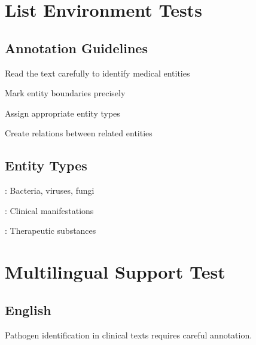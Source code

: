\documentclass[11pt,a4paper]{article}
\begin{document}




\section{List Environment Tests}

\subsection{Annotation Guidelines}
\begin{steplist}
    \item Read the text carefully to identify medical entities
    \item Mark entity boundaries precisely
    \item Assign appropriate entity types
    \item Create relations between related entities
\end{steplist}

\subsection{Entity Types}
\begin{entitylist}
    \item {}: Bacteria, viruses, fungi
    \item {}: Clinical manifestations
    \item {}: Therapeutic substances
\end{entitylist}

\section{Multilingual Support Test}

\subsection{English}
\textenglish{Pathogen identification in clinical texts requires careful annotation.}
\end{document}
